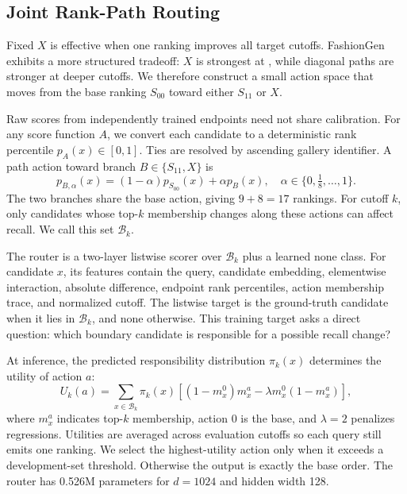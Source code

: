 \subsection{Joint Rank-Path Routing}
\label{sec:routing}

Fixed $X$ is effective when one ranking improves all target cutoffs. FashionGen exhibits a more structured tradeoff: $X$ is strongest at \Rone, while diagonal paths are stronger at deeper cutoffs. We therefore construct a small action space that moves from the base ranking $S_{00}$ toward either $S_{11}$ or $X$.

Raw scores from independently trained endpoints need not share calibration. For any score function $A$, we convert each candidate to a deterministic rank percentile $p_A(x)\in[0,1]$. Ties are resolved by ascending gallery identifier. A path action toward branch $B\in\{S_{11},X\}$ is
\begin{equation}
p_{B,\alpha}(x)=(1-\alpha)p_{S_{00}}(x)+\alpha p_B(x),
\quad \alpha\in\{0,\tfrac18,\ldots,1\}.
\label{eq:rankpath}
\end{equation}
The two branches share the base action, giving $9+8=17$ rankings. For cutoff $k$, only candidates whose top-$k$ membership changes along these actions can affect recall. We call this set $\mathcal{B}_k$.

The router is a two-layer listwise scorer over $\mathcal{B}_k$ plus a learned none class. For candidate $x$, its features contain the query, candidate embedding, elementwise interaction, absolute difference, endpoint rank percentiles, action membership trace, and normalized cutoff. The listwise target is the ground-truth candidate when it lies in $\mathcal{B}_k$, and none otherwise. This training target asks a direct question: which boundary candidate is responsible for a possible recall change?

At inference, the predicted responsibility distribution $\pi_k(x)$ determines the utility of action $a$:
\begin{equation}
U_k(a)=\sum_{x\in\mathcal{B}_k}\pi_k(x)
\left[(1-m_x^0)m_x^a-\lambda m_x^0(1-m_x^a)\right],
\label{eq:utility}
\end{equation}
where $m_x^a$ indicates top-$k$ membership, action $0$ is the base, and $\lambda=2$ penalizes regressions. Utilities are averaged across evaluation cutoffs so each query still emits one ranking. We select the highest-utility action only when it exceeds a development-set threshold. Otherwise the output is exactly the base order. The router has 0.526M parameters for $d=1024$ and hidden width 128.

